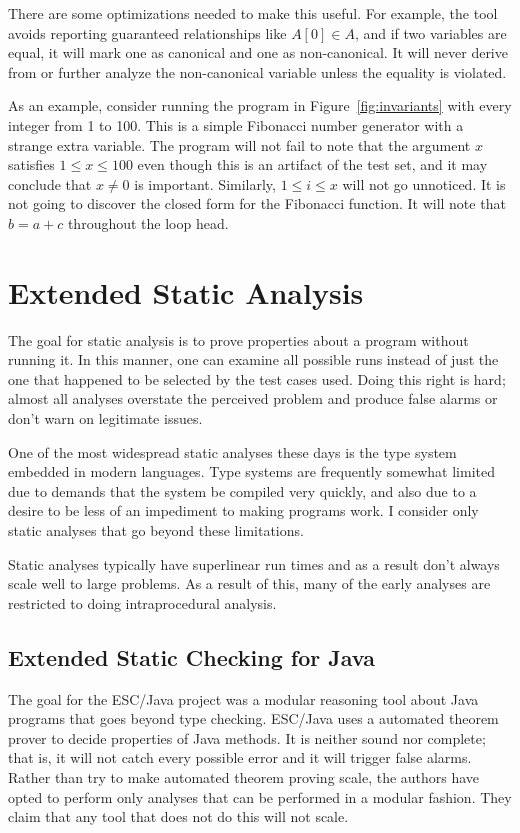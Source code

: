 \documentclass{article}
\begin{document}
\begin{multicols}{2}
There are some optimizations needed to make this useful.  For example,
the tool avoids reporting guaranteed relationships like $A[0] \in A$,
and if two variables are equal, it will mark one as canonical and one
as non-canonical.  It will never derive from or further analyze the
non-canonical variable unless the equality is violated.

As an example, consider running the program in
Figure~\ref{fig:invariants} with every integer from 1 to 100.  This is
a simple Fibonacci number generator with a strange extra variable.
The program will not fail to note that the argument $x$ satisfies $1
\leq x \leq 100$ even though this is an artifact of the test set, and
it may conclude that $x \neq 0$ is important.  Similarly, $1 \leq i
\leq x$ will not go unnoticed.  It is not going to discover the closed
form for the Fibonacci function.  It will note that $b = a + c$
throughout the loop head.

\section{Extended Static Analysis}

The goal for static analysis is to prove properties about a program
without running it.  In this manner, one can examine all possible runs
instead of just the one that happened to be selected by the test cases
used.  Doing this right is hard; almost all analyses overstate the
perceived problem and produce false alarms or don't warn on legitimate
issues.

One of the most widespread static analyses these days is the type
system embedded in modern languages.  Type systems are frequently
somewhat limited due to demands that the system be compiled very
quickly, and also due to a desire to be less of an impediment to
making programs work.  I consider only static analyses that go beyond
these limitations.

Static analyses typically have superlinear run times and as a result
don't always scale well to large problems.  As a result of this, many
of the early analyses are restricted to doing intraprocedural
analysis.

\subsection{Extended Static Checking for Java~\cite{512558}}

The goal for the ESC/Java project was a modular reasoning tool about
Java programs that goes beyond type checking.  ESC/Java uses a
automated theorem prover to decide properties of Java methods.  It is
neither sound nor complete; that is, it will not catch every possible
error and it will trigger false alarms.  Rather than try to make
automated theorem proving scale, the authors have opted to perform
only analyses that can be performed in a modular fashion.  They claim
that any tool that does not do this will not scale.


\end{multicols}
\end{document}
